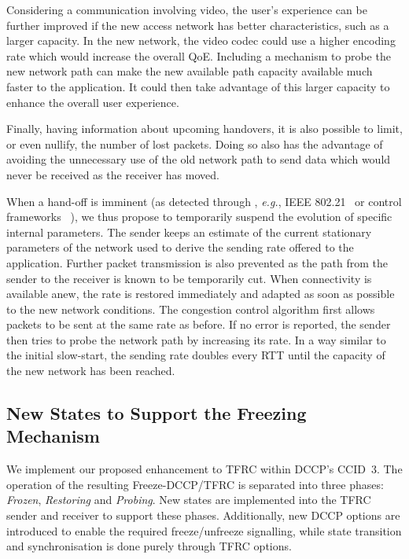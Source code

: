 \documentclass[twocolumn]{nictatechreport}
\newcommand{\latinlocution}[1]{\textit{#1}}
\newcommand{\eg}{\latinlocution{e.g.}}
\begin{document}
Considering a communication involving video, the user's experience can be
further improved if the new access network has better characteristics, such as a
larger capacity. In the new network, the video codec could use a higher encoding
rate which would increase the overall QoE. Including a mechanism to probe the
new network path can make the new available path capacity available much faster
to the application. It could then take advantage of this larger capacity to
enhance the overall user experience.

Finally, having information about upcoming handovers, it is also possible to
limit, or even nullify, the number of lost packets. Doing so also has the
advantage of avoiding the unnecessary use of the old network path to send data
which would never be received as the receiver has moved.

When a hand-off is imminent (as detected through , \eg, IEEE 802.21~\cite{2009piri_80221} or control frameworks
~\cite{2011mehani_multihomed_flow_management}), we thus propose to
temporarily suspend the evolution of specific internal parameters. The sender
keeps an estimate of the current stationary parameters of the network used to
derive the sending rate offered to the application. Further packet transmission
is also prevented as the path from the sender to the receiver is known to be
temporarily cut.  When connectivity is available anew, the rate is restored
immediately and adapted as soon as possible to the new network conditions. The
congestion control algorithm first allows packets to be sent at the same rate as
before. If no error is reported, the sender then tries to probe the network path
by increasing its rate. In a way similar to the initial slow-start, the sending
rate doubles every RTT until the capacity of the new network has been reached.

\subsection{New States to Support the Freezing Mechanism}

We implement our proposed enhancement to TFRC within DCCP's CCID~3. The
operation of the resulting Freeze-DCCP/TFRC is separated into three phases:
\emph{Frozen}, \emph{Restoring} and \emph{Probing}. New states are implemented
into the TFRC sender and receiver to support these phases. Additionally, new
DCCP options are introduced to enable the required freeze/unfreeze signalling,
while state transition and synchronisation is done purely through TFRC options.
\end{document}

